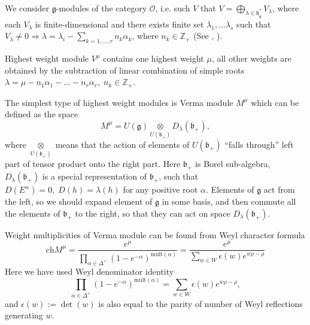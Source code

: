 \documentclass[preprint,12pt]{elsarticle}
\newcommand{\gf}{\mathfrak{g}}
\newcommand{\bff}{\mathfrak{b}}
\newcommand{\hf}{\mathfrak{h}}
\newcommand{\hfg}{\hf_{\gf}}
\begin{document}
We consider $\gf$-modules of the category $\mathcal{O}$, i.e. such $V$ that $V=\bigoplus_{\lambda\in \hfg^{*}} V_{\lambda}$, where each $V_{\lambda}$ is finite-dimensional and there exists finite set $\lambda_{1},\dots \lambda_{s}$ such that $V_{\lambda}\neq 0 \Rightarrow \lambda=\lambda_{i}-\sum_{k=1,\dots, r} n_{k}\alpha_{k}$, where $n_{k}\in \mathbb{Z}_{+}$ (See \cite{humphreys2008representations}, \cite{carter2005lie}).

Highest weight module $V^{\mu}$ contains one highest weight $\mu$, all other weights are obtained by the subtraction of linear combination of simple roots $\lambda=\mu-n_{1}\alpha_{1}-\dots-n_{r}\alpha_{r},\; n_{k}\in \mathbb{Z}_{+}$. 

The simplest type of highest weight modules is Verma module $M^{\mu}$ which can be defined as the space
\begin{equation}
  \label{eq:17}
  M^{\mu}=U(\gf)\underset{U(\bff_{+})}{\otimes} D_{\lambda}(\bff_{+}),
\end{equation}
where $\underset{U(\bff_{+})}{\otimes}$ means that the action of elements of $U(\bff_{+})$ ``falls through'' left part of tensor product onto the right part. Here $\bff_{+}$ is Borel sub-algebra, $D_{\lambda}(\bff_{+})$ is a special representation of $\bff_{+}$, such that $D(E^{\alpha})=0,\; D(h)=\lambda(h)$ for any positive root $\alpha$.
Elements of $\gf$ act from the left, so we should expand element of $\gf$ in some basis, and then commute all the elements of $\bff_{+}$ to the right, so that they can act on space $D_{\lambda}(\bff_{+})$.

Weight multiplicities of Verma module can be found from Weyl character formula
\begin{equation}
  \label{eq:11}
  \mathrm{ch} M^{\mu}=\frac{e^{\mu}}{\prod_{\alpha\in \Delta^{+}} \left( 1-e^{-\alpha}\right)^{\mathrm{mult}(\alpha)}}=\frac{e^{\mu}}{\sum_{w\in W} \epsilon(w) e^{w\rho-\rho}}
\end{equation}
Here we have used Weyl denominator identity
\begin{equation}
  \label{eq:12}
  \prod_{\alpha\in \Delta^{+}} \left( 1-e^{-\alpha}\right)^{\mathrm{mult}(\alpha)}=\sum_{w\in W} \epsilon(w) e^{w\rho-\rho},
\end{equation}
and $\epsilon \left( w\right) :=\det \left( w\right)$ is also equal to the parity of number of Weyl reflections generating $w$.
\end{document}

